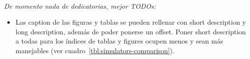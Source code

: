 \cleardoublepage
~\vfill
\thispagestyle{empty}
\begin{doublespace}
\noindent\fontsize{16}{20}\selectfont\itshape
\nohyphenation De momento nada de dedicatorias, mejor TODOs:
\begin{itemize}
	\item Las caption de las figuras y tablas se pueden rellenar con short description y long description, además de poder ponerse un offset. Poner short description a todas para los índices de tablas y figures ocupen menos y sean más manejables (ver cuadro~\ref{tbl:simulators-comparison}).
\end{itemize}
\end{doublespace}
\vfill
\vfill

